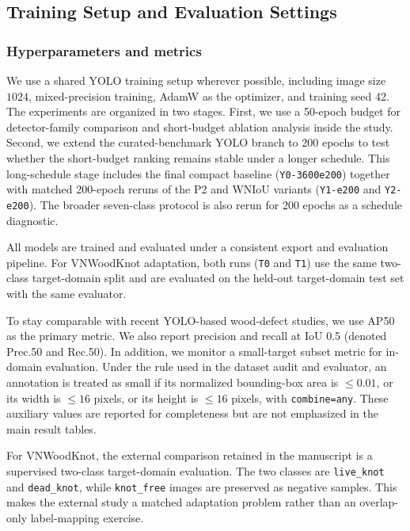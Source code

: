 \documentclass[10pt,a4paper]{article}
\begin{document}
\subsection{Training Setup and Evaluation Settings}
\label{sec:training}

\subsubsection{Hyperparameters and metrics}
We use a shared YOLO training setup wherever possible, including image size $1024$, mixed-precision training, AdamW as the optimizer, and training seed 42. The experiments are organized in two stages. First, we use a 50-epoch budget for detector-family comparison and short-budget ablation analysis inside the study. Second, we extend the curated-benchmark YOLO branch to 200 epochs to test whether the short-budget ranking remains stable under a longer schedule. This long-schedule stage includes the final compact baseline (\texttt{Y0-3600e200}) together with matched 200-epoch reruns of the P2 and WNIoU variants (\texttt{Y1-e200} and \texttt{Y2-e200}). The broader seven-class protocol is also rerun for 200 epochs as a schedule diagnostic.

All models are trained and evaluated under a consistent export and evaluation pipeline. For VNWoodKnot adaptation, both runs (\texttt{T0} and \texttt{T1}) use the same two-class target-domain split and are evaluated on the held-out target-domain test set with the same evaluator.

To stay comparable with recent YOLO-based wood-defect studies, we use AP50 as the primary metric. We also report precision and recall at IoU 0.5 (denoted Prec.50 and Rec.50). In addition, we monitor a small-target subset metric for in-domain evaluation. Under the rule used in the dataset audit and evaluator, an annotation is treated as small if its normalized bounding-box area is $\leq 0.01$, or its width is $\leq 16$ pixels, or its height is $\leq 16$ pixels, with \texttt{combine=any}. These auxiliary values are reported for completeness but are not emphasized in the main result tables.

For VNWoodKnot, the external comparison retained in the manuscript is a supervised two-class target-domain evaluation. The two classes are \texttt{live\_knot} and \texttt{dead\_knot}, while \texttt{knot\_free} images are preserved as negative samples. This makes the external study a matched adaptation problem rather than an overlap-only label-mapping exercise.
\end{document}
